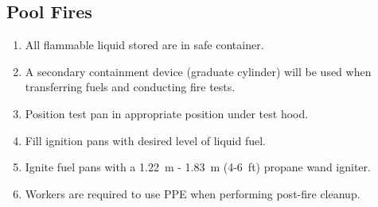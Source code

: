 \documentclass[12pt,oneside]{book}
\begin{document}
\subsection{Pool Fires}
\label{proc_poolfire}
\begin{enumerate}
  \item All flammable liquid stored are in safe container. 
  \item A secondary containment device (graduate cylinder) will be used when transferring fuels and conducting fire tests.
  \item Position test pan in appropriate position under test hood.
  \item Fill ignition pans with desired level of liquid fuel.
  \item Ignite fuel pans with a 1.22~m - 1.83~m (4-6~ft) propane wand igniter.
  \item Workers are required to use PPE when performing post-fire cleanup.
\end{enumerate}
\end{document}
